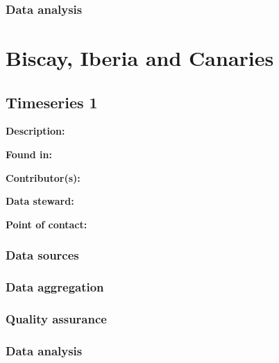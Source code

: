 \documentclass[
]{book}
\begin{document}
\hypertarget{data-analysis-6}{%
\subsection{Data analysis}\label{data-analysis-6}}

\hypertarget{biscay-iberia-and-canaries}{%
\chapter{Biscay, Iberia and Canaries}\label{biscay-iberia-and-canaries}}

\hypertarget{timeseries-1-6}{%
\section{Timeseries 1}\label{timeseries-1-6}}

\textbf{Description:}

\textbf{Found in:}

\textbf{Contributor(s):}

\textbf{Data steward:}

\textbf{Point of contact:}

\hypertarget{data-sources-7}{%
\subsection{Data sources}\label{data-sources-7}}

\hypertarget{data-aggregation-7}{%
\subsection{Data aggregation}\label{data-aggregation-7}}

\hypertarget{quality-assurance-7}{%
\subsection{Quality assurance}\label{quality-assurance-7}}

\hypertarget{data-analysis-7}{%
\subsection{Data analysis}\label{data-analysis-7}}

  
\end{document}
